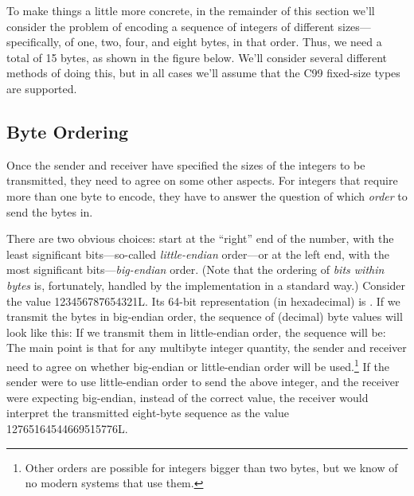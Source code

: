 To make things a little more concrete, in the remainder of this section
we'll consider the problem of encoding a sequence of
integers of different sizes---specifically, of one, two, four, and
eight bytes, in that order.
Thus, we need a total of 15 bytes, as shown in the figure below.
%
%
We'll consider several different methods of doing this, but in all
cases we'll assume that the C99 fixed-size types are supported.

\subsection{Byte Ordering}
\label{sect:byteordering}
Once the sender and receiver have specified the sizes of the integers
to be transmitted, they need to agree on some other aspects.
For integers that require more than
one byte to encode, they have to answer the question of which \emph{order\/} to
send the bytes in.

There are two obvious choices:  start at the ``right'' end
of the number, with the least significant bits---so-called
\emph{little-endian\/} order---or at the left end, with the most
significant bits---\emph{big-endian\/} order.  (Note that
the ordering of \emph{bits within bytes\/} is, fortunately,
handled by the implementation in a standard way.)
%
Consider the  value 123456787654321L.
Its 64-bit representation (in hexadecimal) is .
If we transmit the bytes in big-endian order, the sequence of
(decimal) byte values will look like this:
%
If we transmit them in little-endian order, the sequence will be:
%
The main point is that for any
multibyte integer quantity, the sender and receiver
need to agree on whether big-endian or little-endian order will be
used.\footnote{Other orders are possible for integers bigger than two
bytes, but we know of no modern systems that use them.}
%
If the sender were to use little-endian order to send the above integer, and
the receiver were expecting big-endian, instead of the correct value,
the receiver would interpret the transmitted eight-byte sequence as
the value 12765164544669515776L.

